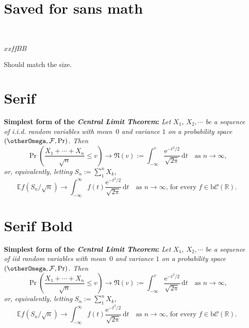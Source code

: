 \documentclass{article}
\makeatletter
\let \Omega   \otherOmega
\newcommand{\savesffamily}{\sfdefault}
\newcommand{\savesfmdseries}{\mdseries@sf}
\newcommand{\savesfbfseries}{\bfseries@sf}
\newif\IfInSansMode
\newif\IfInBoldMode
\makeatother
\begin{document}

\section{Saved for sans math}
\noindent
\savesffamily\
\savesfmdseries\
\savesfbfseries

{\Huge $x$\textit{x}$f$\textit{f}$B$\textit{B}}

\noindent Should match the size.


\section{Serif}

\rmfamily\mdseries{}%
\newcommand{\coloneq}{:=}
\newcommand{\mathup}[1]{\mathrm{#1}}

\textbf{Simplest form of the \textit{Central Limit Theorem}:} \textit{Let
$X_1$, $X_2,\cdots$ be a sequence of i.i.d. random variables with mean~$0$ 
and variance $1$ on a probability space $(\Omega,\mathcal{F},\Pr)$. Then}
\[\Pr\left(\frac{X_1+\cdots+X_n}{\sqrt{n}}\le v\right)\to\mathfrak{N}(v)\coloneq
\int_{-\infty}^v \frac{\mathrm{e}^{-t^2/2}}{\sqrt{2\mathup{\pi}}}\,
\mathrm{d}t\quad\mbox{as $n\to\infty$,}\]
\textit{or, equivalently, letting} $S_n\coloneq\sum_1^n X_k$,
\[\mathbb{E} f\left(S_n/\sqrt{n}\right)\to \int_{-\infty}^\infty f(t)
\frac{\mathrm{e}^{-t^2/2}}{\sqrt{2\mathup{\pi}}}\,\mathrm{d}t
\quad\mbox{as $n\to\infty$, for every $f\in\mathrm{b}
\mathcal{C}(\mathbb{R})$.}\]


\section{Serif Bold}

\rmfamily\bfseries{}
\blindmathpaper

\textbf{Simplest form of the \textit{Central Limit Theorem}:} \textit{Let
$X_1$, $X_2,\cdots$ be a sequence of iid random variables with mean~$0$ 
and variance $1$ on a probability space $(\Omega,\mathcal{F},\Pr)$. Then}
\[\Pr\left(\frac{X_1+\cdots+X_n}{\sqrt{n}}\le v\right)\to\mathfrak{N}(v)\coloneq
\int_{-\infty}^v \frac{\mathrm{e}^{-t^2/2}}{\sqrt{2\mathup{\pi}}}\,
\mathrm{d}t\quad\mbox{as $n\to\infty$,}\]
\textit{or, equivalently, letting} $S_n\coloneq\sum_1^n X_k$,
\[\mathbb{E} f\left(S_n/\sqrt{n}\right)\to \int_{-\infty}^\infty f(t)
\frac{\mathrm{e}^{-t^2/2}}{\sqrt{2\mathup{\pi}}}\,\mathrm{d}t
\quad\mbox{as $n\to\infty$, for every $f\in\mathrm{b}
\mathcal{C}(\mathbb{R})$.}\]
\end{document}
